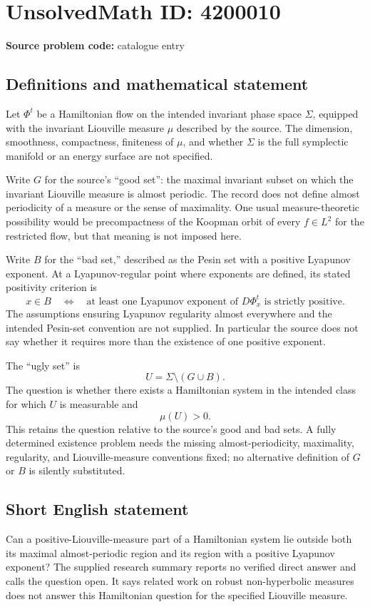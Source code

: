 \documentclass[11pt]{article}
\begin{document}
\section*{UnsolvedMath ID: 4200010}
\textbf{Source problem code:} catalogue entry
\subsection{Definitions and mathematical statement}
Let $\Phi^t$ be a Hamiltonian flow on the intended invariant phase space $\Sigma$, equipped with the invariant Liouville measure $\mu$ described by the source. The dimension, smoothness, compactness, finiteness of $\mu$, and whether $\Sigma$ is the full symplectic manifold or an energy surface are not specified.

Write $G$ for the source's ``good set'': the maximal invariant subset on which the invariant Liouville measure is almost periodic. The record does not define almost periodicity of a measure or the sense of maximality. One usual measure-theoretic possibility would be precompactness of the Koopman orbit of every $f\in L^2$ for the restricted flow, but that meaning is not imposed here.

Write $B$ for the ``bad set,'' described as the Pesin set with a positive Lyapunov exponent. At a Lyapunov-regular point where exponents are defined, its stated positivity criterion is
\[
 x\in B\quad\Longleftrightarrow\quad
          \text{at least one Lyapunov exponent of }D\Phi^t_x
          \text{ is strictly positive}.
\]
The assumptions ensuring Lyapunov regularity almost everywhere and the intended Pesin-set convention are not supplied. In particular the source does not say whether it requires more than the existence of one positive exponent.

The ``ugly set'' is
\[
 U=\Sigma\setminus(G\cup B).
\]
The question is whether there exists a Hamiltonian system in the intended class for which $U$ is measurable and
\[
 \mu(U)>0.
\]
This retains the question relative to the source's good and bad sets. A fully determined existence problem needs the missing almost-periodicity, maximality, regularity, and Liouville-measure conventions fixed; no alternative definition of $G$ or $B$ is silently substituted.
\subsection{Short English statement}
Can a positive-Liouville-measure part of a Hamiltonian system lie outside both its maximal almost-periodic region and its region with a positive Lyapunov exponent? The supplied research summary reports no verified direct answer and calls the question open. It says related work on robust non-hyperbolic measures does not answer this Hamiltonian question for the specified Liouville measure.
\end{document}
